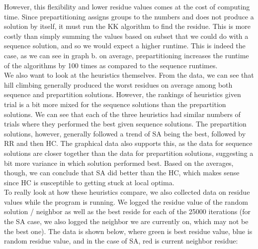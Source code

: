 \documentclass[12pt]{article}
\begin{document}
However, this flexibility and lower residue values comes at the cost of computing time. Since prepartitioning assigns groups to the numbers and does not produce a solution by itself, it must run the KK algorithm to find the residue. This is more costly than simply summing the values based on subset that we could do with a sequence solution, and so we would expect a higher runtime. This is indeed the case, as we can see in graph b. on average, prepartitioning increases the runtime of the algorithms by 100 times as compared to the sequence runtimes. \\

We also want to look at the heuristics themselves. From the data, we can see that hill climbing generally produced the worst residues on average among both sequence and prepartition solutions. However, the rankings of heuristics given trial is a bit more mixed for the sequence solutions than the prepartition solutions. We can see that each of the three heuristics had similar numbers of trials where they performed the best given sequence solutions. The prepartition solutions, however, generally followed a trend of SA being the best, followed by RR and then HC. The graphical data also supports this, as the data for sequence solutions are closer together than the data for prepartition solutions, suggesting a bit more variance in which solution performed best. Based on the averages, though, we can conclude that SA did better than the HC, which makes sense since HC is susceptible to getting stuck at local optima. \\

To really look at how these heuristics compare, we also collected data on residue values while the program is running. We logged the residue value of the random solution / neighbor as well as the best reside for each of the 25000 iterations (for the SA case, we also logged the neighbor we are currently on, which may not be the best one). The data is shown below, where green is best residue value, blue is random residue value, and in the case of SA, red is current neighbor residue:
\end{document}
